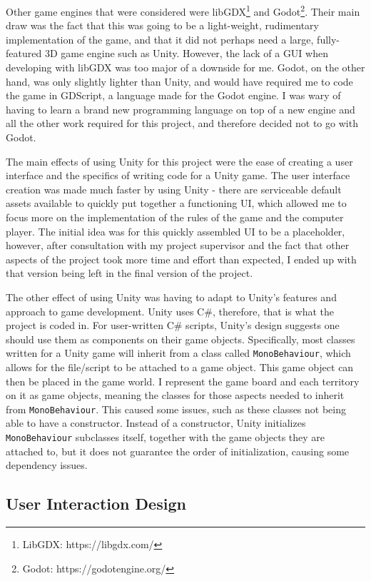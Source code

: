 Other game engines that were considered were libGDX\footnote{LibGDX: https://libgdx.com/} and Godot\footnote{Godot: https://godotengine.org/}. Their main draw was the fact that this was going to be a light-weight, rudimentary implementation of the game, and that it did not perhaps need a large, fully-featured 3D game engine such as Unity. However, the lack of a GUI when developing with libGDX was too major of a downside for me. Godot, on the other hand, was only slightly lighter than Unity, and would have required me to code the game in GDScript, a language made for the Godot engine. I was wary of having to learn a brand new programming language on top of a new engine and all the other work required for this project, and therefore decided not to go with Godot.

The main effects of using Unity for this project were the ease of creating a user interface and the specifics of writing code for a Unity game. The user interface creation was made much faster by using Unity - there are serviceable default assets available to quickly put together a functioning UI, which allowed me to focus more on the implementation of the rules of the game and the computer player. The initial idea was for this quickly assembled UI to be a placeholder, however, after consultation with my project supervisor and the fact that other aspects of the project took more time and effort than expected, I ended up with that version being left in the final version of the project.

The other effect of using Unity was having to adapt to Unity's features and approach to game development. Unity uses C\#, therefore, that is what the project is coded in. For user-written C\# scripts, Unity's design suggests one should use them as components on their game objects. Specifically, most classes written for a Unity game will inherit from a class called \texttt{MonoBehaviour}, which allows for the file/script to be attached to a game object. This game object can then be placed in the game world. I represent the game board and each territory on it as game objects, meaning the classes for those aspects needed to inherit from \texttt{MonoBehaviour}. This caused some issues, such as these classes not being able to have a constructor. Instead of a constructor, Unity initializes \texttt{MonoBehaviour} subclasses itself, together with the game objects they are attached to, but it does not guarantee the order of initialization, causing some dependency issues.

\subsection{User Interaction Design}
\label{userInteractionDesign}

